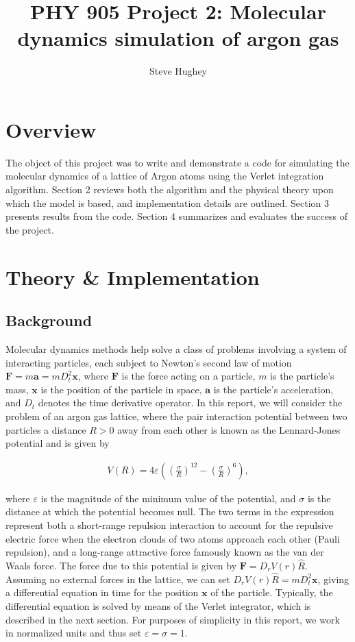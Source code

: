 \documentclass[10pt,a4paper]{article}
\author{Steve Hughey}
\title{PHY 905 Project 2: Molecular dynamics simulation of argon gas}
\begin{document}
\maketitle
\section{Overview}
The object of this project was to write and demonstrate a code for simulating the molecular dynamics of a lattice of Argon atoms using the Verlet integration algorithm. Section 2 reviews both the algorithm and the physical theory upon which the model is based, and implementation details are outlined. Section 3 presents results from the code. Section 4 summarizes and evaluates the success of the project.
\section{Theory \& Implementation}
\subsection{Background}
Molecular dynamics methods help solve a class of problems involving a system of interacting particles, each subject to Newton's second law of motion $\mathbf{F}=m\mathbf{a}=mD_t^2\mathbf{x}$, where $\mathbf{F}$ is the force acting on a particle, $m$ is the particle's mass, $\mathbf{x}$ is the position of the particle in space, $\mathbf{a}$ is the particle's acceleration, and $D_t$ denotes the time derivative operator. In this report, we will consider the problem of an argon gas lattice, where the pair interaction potential between two particles a distance $R>0$ away from each other is known as the Lennard-Jones potential and is given by

\begin{align}
 V(R) = 4\varepsilon \left( \left(\frac{\sigma}{R}\right)^{12} - \left(\frac{\sigma}{R}\right)^{6} \right),
\end{align}

where $\varepsilon$ is the magnitude of the minimum value of the potential, and $\sigma$ is the distance at which the potential becomes null. The two terms in the expression represent both a short-range repulsion interaction to account for the repulsive electric force when the electron clouds of two atoms approach each other (Pauli repulsion), and a long-range attractive force famously known as the van der Waals force. The force due to this potential is given by $\mathbf{F}=D_r V(r) \hat{R}$. Assuming no external forces in the lattice, we can set $D_rV(r)\hat{R}=m D_t^2 \mathbf{x}$, giving a differential equation in time for the position $\mathbf{x}$ of the particle. Typically, the differential equation is solved by means of the Verlet integrator, which is described in the next section. For purposes of simplicity in this report, we work in normalized units and thus set $\varepsilon = \sigma = 1$.
\end{document}
